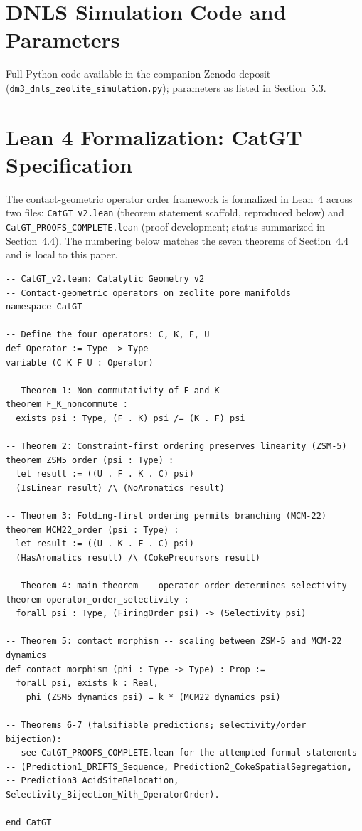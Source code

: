 \documentclass[11pt]{article}
\begin{document}
\appendix

\section{DNLS Simulation Code and Parameters}
Full Python code available in the companion Zenodo deposit (\texttt{dm3\_dnls\_zeolite\_simulation.py}); parameters as listed in Section~5.3.

\section{Lean 4 Formalization: CatGT Specification}

The contact-geometric operator order framework is formalized in Lean~4 across two files: \texttt{CatGT\_v2.lean} (theorem statement scaffold, reproduced below) and \texttt{CatGT\_PROOFS\_COMPLETE.lean} (proof development; status summarized in Section~4.4). The numbering below matches the seven theorems of Section~4.4 and is local to this paper.

{\small
\begin{verbatim}
-- CatGT_v2.lean: Catalytic Geometry v2
-- Contact-geometric operators on zeolite pore manifolds
namespace CatGT

-- Define the four operators: C, K, F, U
def Operator := Type -> Type
variable (C K F U : Operator)

-- Theorem 1: Non-commutativity of F and K
theorem F_K_noncommute :
  exists psi : Type, (F . K) psi /= (K . F) psi

-- Theorem 2: Constraint-first ordering preserves linearity (ZSM-5)
theorem ZSM5_order (psi : Type) :
  let result := ((U . F . K . C) psi)
  (IsLinear result) /\ (NoAromatics result)

-- Theorem 3: Folding-first ordering permits branching (MCM-22)
theorem MCM22_order (psi : Type) :
  let result := ((U . K . F . C) psi)
  (HasAromatics result) /\ (CokePrecursors result)

-- Theorem 4: main theorem -- operator order determines selectivity
theorem operator_order_selectivity :
  forall psi : Type, (FiringOrder psi) -> (Selectivity psi)

-- Theorem 5: contact morphism -- scaling between ZSM-5 and MCM-22 dynamics
def contact_morphism (phi : Type -> Type) : Prop :=
  forall psi, exists k : Real,
    phi (ZSM5_dynamics psi) = k * (MCM22_dynamics psi)

-- Theorems 6-7 (falsifiable predictions; selectivity/order bijection):
-- see CatGT_PROOFS_COMPLETE.lean for the attempted formal statements
-- (Prediction1_DRIFTS_Sequence, Prediction2_CokeSpatialSegregation,
-- Prediction3_AcidSiteRelocation, Selectivity_Bijection_With_OperatorOrder).

end CatGT
\end{verbatim}
}
\end{document}
